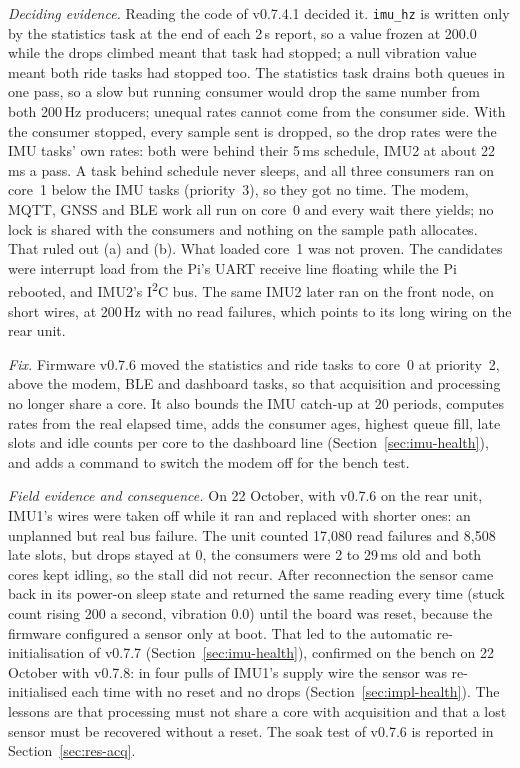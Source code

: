 \emph{Deciding evidence.} Reading the code of v0.7.4.1 decided it. \texttt{imu\_hz} is written only by the statistics task at the end of each 2\,s report, so a value frozen at 200.0 while the drops climbed meant that task had stopped; a null vibration value meant both ride tasks had stopped too. The statistics task drains both queues in one pass, so a slow but running consumer would drop the same number from both 200\,Hz producers; unequal rates cannot come from the consumer side. With the consumer stopped, every sample sent is dropped, so the drop rates were the IMU tasks' own rates: both were behind their 5\,ms schedule, IMU2 at about 22\,ms a pass. A task behind schedule never sleeps, and all three consumers ran on core~1 below the IMU tasks (priority~3), so they got no time. The modem, MQTT, GNSS and BLE work all run on core~0 and every wait there yields; no lock is shared with the consumers and nothing on the sample path allocates. That ruled out (a) and (b). What loaded core~1 was not proven. The candidates were interrupt load from the Pi's UART receive line floating while the Pi rebooted, and IMU2's I\textsuperscript{2}C bus. The same IMU2 later ran on the front node, on short wires, at 200\,Hz with no read failures, which points to its long wiring on the rear unit.

\emph{Fix.} Firmware v0.7.6 moved the statistics and ride tasks to core~0 at priority~2, above the modem, BLE and dashboard tasks, so that acquisition and processing no longer share a core. It also bounds the IMU catch-up at 20 periods, computes rates from the real elapsed time, adds the consumer ages, highest queue fill, late slots and idle counts per core to the dashboard line (Section~\ref{sec:imu-health}), and adds a command to switch the modem off for the bench test.

\emph{Field evidence and consequence.} On 22 October, with v0.7.6 on the rear unit, IMU1's wires were taken off while it ran and replaced with shorter ones: an unplanned but real bus failure. The unit counted 17,080 read failures and 8,508 late slots, but drops stayed at 0, the consumers were 2 to 29\,ms old and both cores kept idling, so the stall did not recur. After reconnection the sensor came back in its power-on sleep state and returned the same reading every time (stuck count rising 200 a second, vibration 0.0) until the board was reset, because the firmware configured a sensor only at boot. That led to the automatic re-initialisation of v0.7.7 (Section~\ref{sec:imu-health}), confirmed on the bench on 22 October with v0.7.8: in four pulls of IMU1's supply wire the sensor was re-initialised each time with no reset and no drops (Section~\ref{sec:impl-health}). The lessons are that processing must not share a core with acquisition and that a lost sensor must be recovered without a reset. The soak test of v0.7.6 is reported in Section~\ref{sec:res-acq}.

